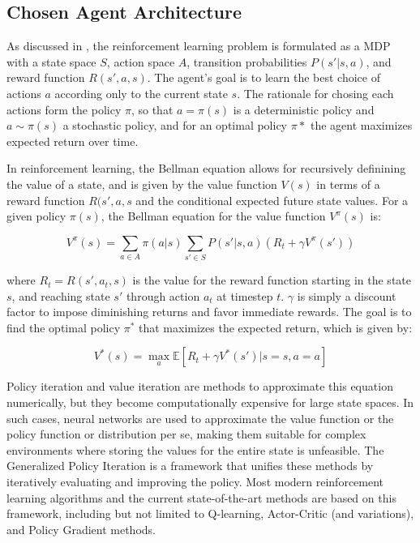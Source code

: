 \documentclass[11pt]{article}
\begin{document}
    \subsection{Chosen Agent Architecture}
    \label{subsec:agent}

    As discussed in , the reinforcement learning problem is formulated as a MDP with a state space \( S \),
    action space \( A \), transition probabilities $P(s'|s, a)$, and reward function $R(s', a, s)$.
    The agent's goal is to learn the best choice of actions $a$ according only to the current state $s$.
    The rationale for chosing each actions form the policy $\pi$, 
    so that $a = \pi(s)$ is a deterministic policy and $a \sim \pi(s)$ a stochastic policy,
    and for an optimal policy $\pi*$ the agent maximizes expected return over time.

    In reinforcement learning, the Bellman equation allows for recursively definining the value of a state, 
    and is given by the value function $V(s)$ in terms of a reward function $R(s', a, s$ and the conditional expected future state values.
    For a given policy \( \pi(s) \), the Bellman equation for the value function \( V^{\pi}(s) \) is:

    \[
        V^{\pi}(s) = \sum_{a \in A} \pi(a|s) \sum_{s' \in S} P(s'|s, a) \left( R_t + \gamma V^{\pi}(s') \right)
    \]

    where \( R_t = R(s', a_t, s)\) is the value for the reward function starting in the state $s$, and reaching state $s'$ through
    action $a_t$ at timestep $t$. \( \gamma \) is simply a discount factor to impose diminishing returns and favor immediate rewards.
    The goal is to find the optimal policy \( \pi^* \) that maximizes the expected return, which is given by:

    \[
        V^*(s) = \max_a \mathbb{E}[R_t + \gamma V^*(s') | s = s, a = a]
    \]

    Policy iteration and value iteration are methods to approximate this equation numerically,
    but they become computationally expensive for large state spaces.
    In such cases, neural networks are used to approximate the value function or the policy function or distribution per se, 
    making them suitable for complex environments where storing the values for the entire state is unfeasible.
    The Generalized Policy Iteration is a framework that unifies these methods by iteratively evaluating and improving the policy.
    Most modern reinforcement learning algorithms and the current state-of-the-art methods are based on this framework,
    including but not limited to Q-learning, Actor-Critic (and variations), and Policy Gradient methods.
\end{document}
